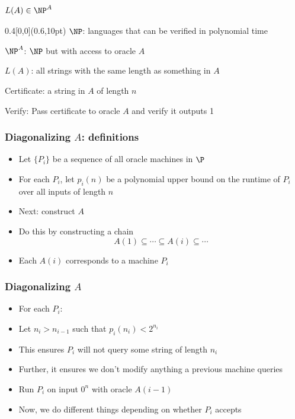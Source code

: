 \documentclass[xcolor={usenames,dvipsnames}]{beamer}
\begin{document}
\begin{frame}
  \frametitle{$L(A) \in \NP^{A}$}
  \begin{textblock*}{0.4\paperwidth}[0,0](0.6\textwidth,10pt)
    \tiny
    $\NP$: languages that can be verified in polynomial time

    $\NP^{A}$: $\NP$ but with access to oracle $A$

    $L(A)$: all strings with the same length as something in $A$
  \end{textblock*}

  Certificate: a string in $A$ of length $n$

  \bigskip
  Verify: Pass certificate to oracle $A$ and verify it outputs 1
\end{frame}

\begin{frame}
  \frametitle{Diagonalizing $A$: definitions}
  \begin{itemize}
    \item Let $\{P_{i}\}$ be a sequence of all oracle machines in $\P$
    \item For each $P_{i}$, let $p_{i}(n)$ be a polynomial upper bound on the
          runtime of $P_{i}$ over all inputs of length $n$
    \item Next: construct $A$
    \item Do this by constructing a chain
          \[
            A(1) \subseteq \cdots \subseteq A(i) \subseteq \cdots
          \]
    \item Each $A(i)$ corresponds to a machine $P_{i}$
   \end{itemize}
\end{frame}

\begin{frame}
  \frametitle{Diagonalizing $A$}
  \begin{itemize}
    \item For each $P_{i}$:
    \item Let $n_{i} > n_{i-1}$ such that $p_{i}(n_{i}) < 2^{n_{i}}$
    \item This ensures $P_{i}$ will not query some string of length $n_{i}$

    \item Further, it ensures we don't modify anything a previous machine
          queries
    \item Run $P_{i}$ on input $0^{n}$ with oracle $A(i-1)$
    \item Now, we do different things depending on whether $P_{i}$ accepts
  \end{itemize}
\end{frame}
\end{document}
